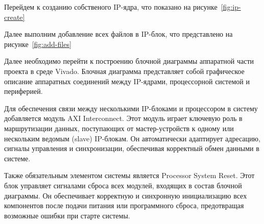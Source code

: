 
Перейдем к созданию собственого IP-ядра, что показано на 
рисунке~\ref{fig:ip-create}











Далее выполним добавление всех файлов в IP-блок, что 
представлено на рисунке~\ref{fig:add-files}




Далее необходимо перейти к построению блочной диаграммы аппаратной части 
проекта в среде Vivado. Блочная диаграмма представляет собой графическое 
описание аппаратных соединений между IP-ядрами, процессорной системой и 
периферией.

Для обеспечения связи между несколькими IP-блоками и процессором в систему 
добавляется модуль AXI Interconnect. Этот модуль играет ключевую роль в 
маршрутизации данных, поступающих от мастер-устройств к одному или нескольким 
ведомым (slave) IP-блокам. Он автоматически адаптирует адресацию, сигналы 
управления и синхронизации, обеспечивая корректный обмен данными в системе.

Также обязательным элементом системы является Processor System Reset. Этот блок 
управляет сигналами сброса всех модулей, входящих в состав блочной диаграммы. 
Он обеспечивает корректную и синхронную инициализацию всех компонентов после 
подачи питания или программного сброса, предотвращая возможные ошибки при 
старте системы.

